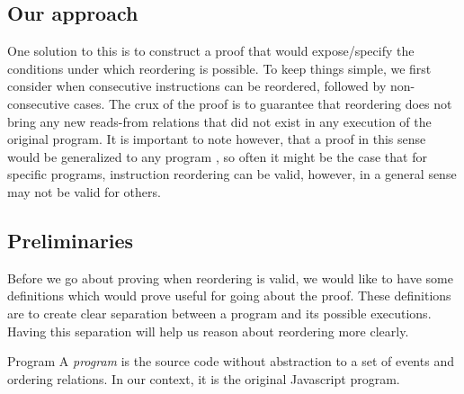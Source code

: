     \subsection{Our approach}
    One solution to this is to construct a proof that would expose/specify the conditions under which reordering is possible. To keep things simple, we first consider when consecutive instructions can be reordered, followed by non-consecutive cases. The crux of the proof is to guarantee that reordering does not bring any new reads-from relations that did not exist in any execution of the original program. It is important to note however, that a proof in this sense would be generalized to any program , so often it might be the case that for specific programs, instruction reordering can be valid, however, in a general sense may not be valid for others. 
    

    \subsection{Preliminaries}
    
    Before we go about proving when reordering is valid, we would like to have some definitions which would prove useful for going about the proof. These definitions are to create clear separation between a program and its possible executions. Having this separation will help us reason about reordering more clearly.   
    
    \begin{definition}{Program} 
        A \emph{program} is the source code without abstraction to a set of events and ordering relations. In our context, it is the original Javascript program. 
        
    \end{definition}
    
